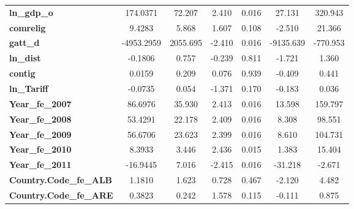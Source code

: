 \begin{center}
\begin{tabular}{lcccccc}
\textbf{ln\_gdp\_o}                                       &     174.0371  &       72.207     &     2.410  &         0.016        &       27.131    &      320.943     \\
\textbf{comrelig}                                         &       9.4283  &        5.868     &     1.607  &         0.108        &       -2.510    &       21.366     \\
\textbf{gatt\_d}                                          &   -4953.2959  &     2055.695     &    -2.410  &         0.016        &    -9135.639    &     -770.953     \\
\textbf{ln\_dist}                                         &      -0.1806  &        0.757     &    -0.239  &         0.811        &       -1.721    &        1.360     \\
\textbf{contig}                                           &       0.0159  &        0.209     &     0.076  &         0.939        &       -0.409    &        0.441     \\
\textbf{ln\_Tariff}                                       &      -0.0735  &        0.054     &    -1.371  &         0.170        &       -0.183    &        0.036     \\
\textbf{Year\_fe\_2007}                                   &      86.6976  &       35.930     &     2.413  &         0.016        &       13.598    &      159.797     \\
\textbf{Year\_fe\_2008}                                   &      53.4291  &       22.178     &     2.409  &         0.016        &        8.308    &       98.551     \\
\textbf{Year\_fe\_2009}                                   &      56.6706  &       23.623     &     2.399  &         0.016        &        8.610    &      104.731     \\
\textbf{Year\_fe\_2010}                                   &       8.3933  &        3.446     &     2.436  &         0.015        &        1.383    &       15.404     \\
\textbf{Year\_fe\_2011}                                   &     -16.9445  &        7.016     &    -2.415  &         0.016        &      -31.218    &       -2.671     \\
\textbf{Country.Code\_fe\_ALB}                            &       1.1810  &        1.623     &     0.728  &         0.467        &       -2.120    &        4.482     \\
\textbf{Country.Code\_fe\_ARE}                            &       0.3823  &        0.242     &     1.578  &         0.115        &       -0.111    &        0.875     \\

\end{tabular}
\end{center}
